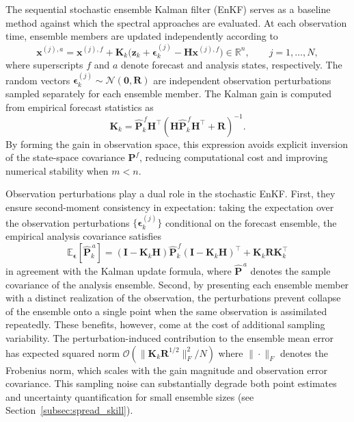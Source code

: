 \documentclass[11pt,a4paper]{article}
\begin{document}
The sequential stochastic ensemble Kalman filter (EnKF) \citep{burgers1998,houtekamer1998data} serves as a baseline method against which the spectral approaches are evaluated. At each observation time, ensemble members are updated independently according to
\begin{equation}
\mathbf{x}^{(j),a}
=
\mathbf{x}^{(j),f}
+
\mathbf{K}_k\bigl(\mathbf{z}_k+\boldsymbol{\epsilon}_{k}^{(j)}-\mathbf{H}\mathbf{x}^{(j),f}\bigr) \in \mathbb{R}^{n},
\qquad j=1,\ldots,N,
\label{eq:enkf_update}
\end{equation}
where superscripts $f$ and $a$ denote forecast and analysis states, respectively. The random vectors $\boldsymbol{\epsilon}_{k}^{(j)}\sim\mathcal{N}(\mathbf{0},\mathbf{R})$ are independent observation perturbations sampled separately for each ensemble member. The Kalman gain is computed from empirical forecast statistics as
\begin{equation}
\mathbf{K}_k
=
\widehat{\mathbf{P}}^{\,f}_{k}\mathbf{H}^\top
\left(\mathbf{H}\widehat{\mathbf{P}}_{k}^{\,f}\mathbf{H}^\top+\mathbf{R}\right)^{-1}.
\label{eq:kalman_gain}
\end{equation}
By forming the gain in observation space, this expression avoids explicit inversion of the state-space covariance $\mathbf{P}^f$, reducing computational cost and improving numerical stability when $m<n$.

Observation perturbations play a dual role in the stochastic EnKF. First, they ensure second-moment consistency in expectation: taking the expectation over the observation perturbations $\{\boldsymbol{\epsilon}_{k}^{(j)}\}$ conditional on the forecast ensemble, the empirical analysis covariance satisfies
\begin{equation}
\mathbb{E}_{\boldsymbol{\epsilon}}[\widehat{\mathbf{P}}_{k}^{\,a}]=(\mathbf{I}-\mathbf{K}_k\mathbf{H})\widehat{\mathbf{P}}_{k}^{\,f}(\mathbf{I}-\mathbf{K}_k\mathbf{H})^\top + \mathbf{K}_k\mathbf{R}\mathbf{K}_k^\top
\end{equation}
in agreement with the Kalman update formula, where $\widehat{\mathbf{P}}^{\,a}$ denotes the sample covariance of the analysis ensemble. Second, by presenting each ensemble member with a distinct realization of the observation, the perturbations prevent collapse of the ensemble onto a single point when the same observation is assimilated repeatedly. These benefits, however, come at the cost of additional sampling variability. The perturbation-induced contribution to the ensemble mean error has expected squared norm $\mathcal{O}(\|\mathbf{K}_k\mathbf{R}^{1/2}\|_F^2/N)$ where $\|\cdot \|_F$ denotes the Frobenius norm, which scales with the gain magnitude and observation error covariance. This sampling noise can substantially degrade both point estimates and uncertainty quantification for small ensemble sizes (see Section~\ref{subsec:spread_skill}).
\end{document}
